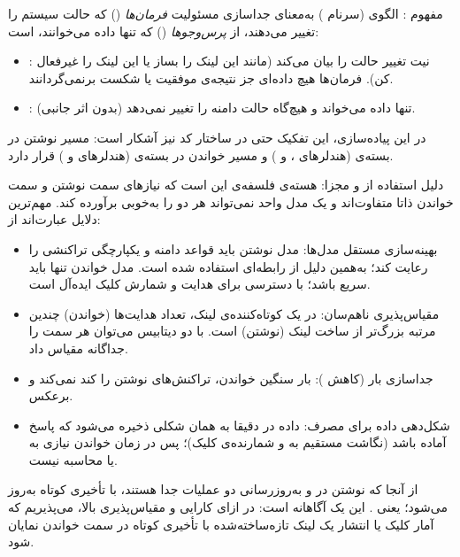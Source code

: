 
{مفهوم :}
الگوی  (سرنام ) به‌معنای جداسازی مسئولیت \emph{فرمان‌ها} () که حالت سیستم را تغییر می‌دهند، از \emph{پرس‌وجوها} () که تنها داده می‌خوانند، است:

\begin{itemize}
	\item {:} نیت تغییر حالت را بیان می‌کند (مانند این لینک را بساز یا این لینک را غیرفعال کن). فرمان‌ها هیچ داده‌ای جز نتیجه‌ی موفقیت یا شکست برنمی‌گردانند.
	\item {:} تنها داده می‌خواند و هیچ‌گاه حالت دامنه را تغییر نمی‌دهد (بدون اثر جانبی).
\end{itemize}

در این پیاده‌سازی، این تفکیک حتی در ساختار کد نیز آشکار است: مسیر نوشتن در بسته‌ی  (هندلرهای ،  و ) و مسیر خواندن در بسته‌ی  (هندلرهای  و ) قرار دارد.

{دلیل استفاده از  و  مجزا:}
هسته‌ی فلسفه‌ی  این است که نیازهای سمت نوشتن و سمت خواندن ذاتا متفاوت‌اند و یک مدل واحد نمی‌تواند هر دو را به‌خوبی برآورده کند. مهم‌ترین دلایل عبارت‌اند از:

\begin{itemize}
	\item {بهینه‌سازی مستقل مدل‌ها:} مدل نوشتن باید قواعد دامنه و یکپارچگی تراکنشی را رعایت کند؛ به‌همین دلیل از  رابطه‌ای استفاده شده است. مدل خواندن تنها باید سریع باشد؛  با دسترسی  برای هدایت و شمارش کلیک ایده‌آل است.
	\item {مقیاس‌پذیری ناهم‌سان:} در یک کوتاه‌کننده‌ی لینک، تعداد هدایت‌ها (خواندن) چندین مرتبه بزرگ‌تر از ساخت لینک (نوشتن) است. با دو دیتابیس می‌توان هر سمت را جداگانه مقیاس داد.
	\item {جداسازی بار (کاهش ):} بار سنگین خواندن، تراکنش‌های نوشتن را کند نمی‌کند و برعکس.
	\item {شکل‌دهی داده برای مصرف:} داده در  دقیقا به همان شکلی ذخیره می‌شود که پاسخ آماده باشد (نگاشت مستقیم  به  و شمارنده‌ی کلیک)؛ پس در زمان خواندن نیازی به  یا محاسبه نیست.
\end{itemize}

از آنجا که نوشتن در  و به‌روزرسانی  دو عملیات جدا هستند،  با تأخیری کوتاه به‌روز می‌شود؛ یعنی . این یک  آگاهانه است: در ازای کارایی و مقیاس‌پذیری بالا، می‌پذیریم که آمار کلیک یا انتشار یک لینک تازه‌ساخته‌شده با تأخیری کوتاه در سمت خواندن نمایان شود.

